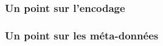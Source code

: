 \begin{frame}
\frametitle{Un point sur l'encodage}

\end{frame}


\begin{frame}
\frametitle{Un point sur les méta-données}

\end{frame}


